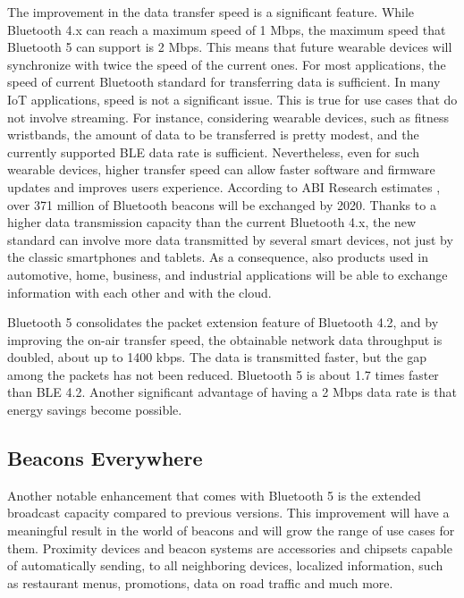 \documentclass[12pt, draftclsnofoot, onecolumn]{IEEEtran}
\begin{document}
The improvement in the data transfer speed is a significant feature. While Bluetooth 4.x can reach a maximum speed of 1 Mbps, the maximum speed that Bluetooth 5 can support is 2 Mbps. This means that future wearable devices will synchronize with twice the speed of the current ones. For most applications, the speed of current Bluetooth standard for transferring data is sufficient. In many IoT applications, speed is not a significant issue. This is true for use cases that do not involve streaming. For instance, considering wearable devices, such as fitness wristbands, the amount of data to be transferred is pretty modest, and the currently supported BLE data rate is sufficient. Nevertheless, even for such wearable devices, higher transfer speed can allow faster software and firmware updates and improves users experience. According to ABI Research estimates \cite{abi}, over 371 million of Bluetooth beacons will be exchanged by 2020. Thanks to a higher data transmission capacity than the current Bluetooth 4.x, the new standard can involve more data transmitted by several smart devices, not just by the classic smartphones and tablets. As a consequence, also products used in automotive, home, business, and industrial applications will be able to exchange information with each other and with the cloud.

Bluetooth 5 consolidates the packet extension feature of Bluetooth 4.2, and by improving the on-air transfer speed, the obtainable network data throughput is doubled, about up to 1400 kbps. 
The data is transmitted faster, but the gap among the packets has not been reduced. Bluetooth 5 is about 1.7 times faster than BLE 4.2. Another significant advantage of having a 2 Mbps data rate is that energy savings become possible. 

\subsection{Beacons Everywhere}
\label{subsec:beacons}

Another notable enhancement that comes with Bluetooth 5 is the extended broadcast capacity compared to previous versions. This improvement will have a meaningful result in the world of beacons and will grow the range of use cases for them. Proximity devices and beacon systems are accessories and chipsets capable of automatically sending, to all neighboring devices, localized information, such as restaurant menus, promotions, data on road traffic and much more. 
\end{document}
